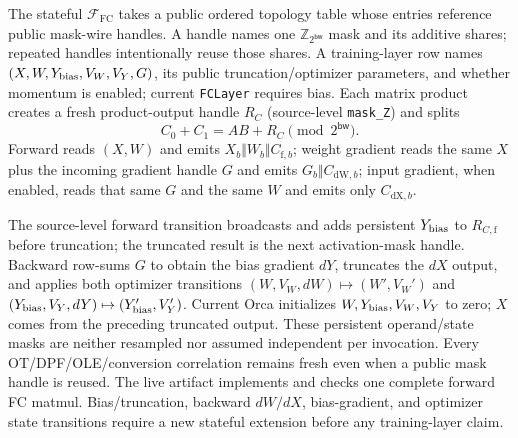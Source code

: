 \documentclass[11pt]{article}
\newcommand{\Z}{\mathbb{Z}}
\newcommand{\bw}{\mathsf{bw}}
\begin{document}
The stateful $\mathcal F_{\mathrm{FC}}$ takes a public ordered topology table
whose entries reference public mask-wire handles. A handle names one
$\Z_{2^\bw}$ mask and its additive shares; repeated handles intentionally
reuse those shares. A training-layer row names
$(X,W,Y_{\rm bias},V_W,V_Y,G)$, its public truncation/optimizer parameters,
and whether momentum is enabled; current \texttt{FCLayer} requires bias.
Each matrix product creates a fresh product-output handle $R_C$ (source-level
\texttt{mask\_Z}) and splits
\[
 C_0+C_1=AB+R_C \pmod {2^\bw}.
\]
Forward reads $(X,W)$ and emits
$X_b\Vert W_b\Vert C_{\mathrm f,b}$; weight gradient reads the same $X$ plus
the incoming gradient handle $G$ and emits
$G_b\Vert C_{\mathrm{dW},b}$; input gradient, when enabled, reads that same
$G$ and the same $W$ and emits only $C_{\mathrm{dX},b}$.

The source-level forward transition broadcasts and adds persistent
$Y_{\rm bias}$ to $R_{C,\mathrm f}$ before truncation; the truncated result is
the next activation-mask handle. Backward row-sums $G$ to obtain the bias
gradient $dY$, truncates the $dX$ output, and applies both optimizer
transitions
$(W,V_W,dW)\mapsto(W',V_W')$ and
$(Y_{\rm bias},V_Y,dY)\mapsto(Y_{\rm bias}',V_Y')$.
Current Orca initializes $W,Y_{\rm bias},V_W,V_Y$ to zero; $X$ comes from the
preceding truncated output. These persistent operand/state masks are neither
resampled nor assumed independent per invocation. Every OT/DPF/OLE/conversion
correlation remains fresh even when a public mask handle is reused.
The live artifact implements and checks one complete forward FC matmul.
Bias/truncation, backward $dW/dX$, bias-gradient, and optimizer state
transitions require a new stateful extension before any training-layer claim.
\end{document}
